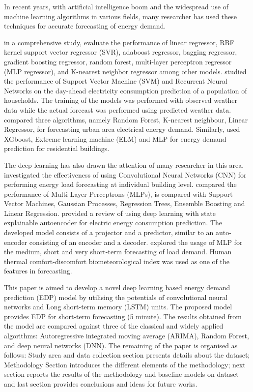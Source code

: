 \documentclass[twocolumn, a4paper,10pt]{article}
\begin{document}
In recent years, with artificial intelligence boom and the widespread use of machine learning algorithms in various fields, many researcher has used these techniques for accurate forecasting of energy demand. 

\cite{RN21} in a comprehensive study, evaluate the performance of linear regressor, RBF kernel support vector regressor (SVR), adaboost regressor, bagging regressor, gradient boosting regressor, random forest, multi-layer perceptron regressor (MLP regressor), and K-nearest neighbor regressor among other models. \cite{RN1199} studied the performance of Support Vector Machine (SVM) and Recurrent Neural Networks on the day-ahead electricity consumption prediction of a population of households. The training of the models was performed with observed weather data while the actual forecast was performed using predicted weather data. \cite{RN1194} compared three algorithms, namely Random Forest, K-nearest neighbour, Linear Regressor, for forecasting urban area electrical energy demand. Similarly, \cite{RN1197} used XGboost, Extreme learning machine (ELM) and MLP for energy demand prediction for residential buildings.

The deep learning has also drawn the attention of many researcher in this area. \cite{RN13} investigated the effectiveness of using Convolutional Neural Networks (CNN) for performing energy load forecasting at
individual building level. \cite{RN29} compared the performance of Multi Layer Perceptrons (MLPs),
is compared with Support Vector Machines, Gaussian Processes, Regression Trees, Ensemble Boosting and Linear Regression. \cite{RN1195} provided a review of using deep learning with state explainable autoencoder for electric energy consumption prediction. The developed model consists of a projector and a predictor, similar to an auto-encoder consisting of an encoder and a decoder. \cite{RN59} explored the usage of MLP for the medium, short and very short-term forecasting of load demand. Human thermal comfort-discomfort biometeorological index was used as one of the features in forecasting.

This paper is aimed to develop a novel deep learning based energy demand prediction (EDP) model by utilising the potentials of convolutional neural networks and Long short-term memory (LSTM) units. The proposed model provides EDP for short-term forecasting (5 minute). The results obtained from the model are compared against three of the classical and widely applied algorithms: Autoregressive integrated moving average (ARIMA), Random Forest, and deep neural networks (DNN). The remaining of the paper is organised as follows: Study area and data collection section presents details about the dataset; Methodology Section introduces the different elements of the methodology; next section reports the results of the methodology and baseline models on dataset and last section provides conclusions and ideas for future works.
\end{document}
